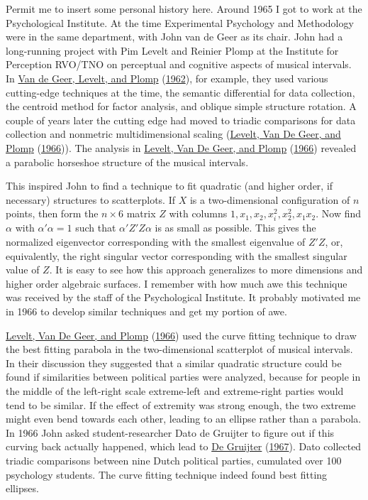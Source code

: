 \documentclass[
  12pt,
]{book}
\theoremstyle{definition}
\theoremstyle{definition}
\theoremstyle{definition}
\theoremstyle{definition}
\theoremstyle{remark}
\begin{document}
Permit me to insert some personal history here. Around 1965 I got to work at the Psychological Institute. At the time Experimental Psychology and Methodology were in the same department, with John van de Geer as its chair. John had a long-running project with Pim Levelt and Reinier Plomp at the Institute for Perception RVO/TNO on perceptual and cognitive aspects of musical intervals. In \protect\hyperlink{ref-vandegeer_levelt_plomp_62}{Van de Geer, Levelt, and Plomp} (\protect\hyperlink{ref-vandegeer_levelt_plomp_62}{1962}), for example, they used various cutting-edge techniques at the time, the semantic differential for data collection, the centroid method for factor analysis, and oblique simple structure rotation. A couple of years later the cutting edge had moved to triadic comparisons
for data collection and nonmetric multidimensional scaling (\protect\hyperlink{ref-levelt_vandegeer_plomp_66}{Levelt, Van De Geer, and Plomp} (\protect\hyperlink{ref-levelt_vandegeer_plomp_66}{1966})).
The analysis in \protect\hyperlink{ref-levelt_vandegeer_plomp_66}{Levelt, Van De Geer, and Plomp} (\protect\hyperlink{ref-levelt_vandegeer_plomp_66}{1966}) revealed a parabolic horseshoe structure
of the musical intervals.

This inspired John to find a technique to fit quadratic (and higher order, if necessary) structures to scatterplots. If \(X\) is a two-dimensional configuration of \(n\) points, then form the \(n\times 6\) matrix \(Z\) with columns \(1,x_1,x_2,x_i^2,x_2^2,x_1x_2\). Now find \(\alpha\) with \(\alpha'\alpha=1\) such that \(\alpha'Z'Z\alpha\) is as small as possible. This gives the normalized eigenvector corresponding with the smallest eigenvalue of \(Z'Z\), or, equivalently, the right singular vector corresponding with the smallest singular value of \(Z\). It is easy to see how this approach generalizes to more dimensions and higher order algebraic surfaces. I remember with how much awe this technique was received by the staff of the Psychological Institute. It probably motivated me in 1966 to develop similar techniques and get my portion of awe.

\protect\hyperlink{ref-levelt_vandegeer_plomp_66}{Levelt, Van De Geer, and Plomp} (\protect\hyperlink{ref-levelt_vandegeer_plomp_66}{1966}) used the curve fitting technique to draw the best fitting parabola in the two-dimensional scatterplot of musical intervals. In their discussion they suggested that a similar quadratic structure could be found if similarities between political parties were analyzed, because for people in the middle of the left-right scale extreme-left and extreme-right parties would tend to be similar. If the effect of extremity was strong enough, the two extreme might even bend towards each other, leading to an ellipse rather than a parabola. In 1966 John asked student-researcher Dato de Gruijter to figure out if this curving back actually happened, which lead to \protect\hyperlink{ref-degruijter_67}{De Gruijter} (\protect\hyperlink{ref-degruijter_67}{1967}). Dato collected triadic comparisons between nine Dutch political parties, cumulated over 100 psychology students. The curve fitting technique indeed found best fitting ellipses.
\end{document}
